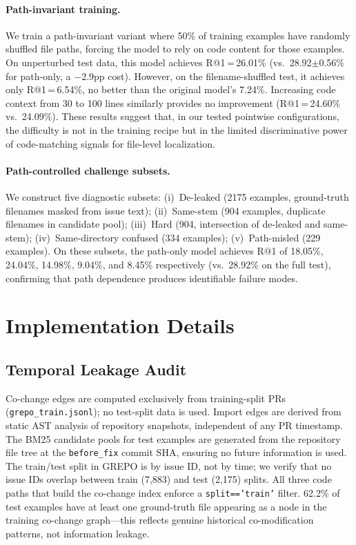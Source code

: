 \documentclass{article}
\begin{document}
\paragraph{Path-invariant training.}
We train a path-invariant variant where 50\% of training examples have randomly shuffled file paths, forcing the model to rely on code content for those examples. On unperturbed test data, this model achieves R@1\,=\,26.01\% (vs.\ 28.92$\pm$0.56\% for path-only, a $-$2.9pp cost). However, on the filename-shuffled test, it achieves only R@1\,=\,6.54\%, no better than the original model's 7.24\%. Increasing code context from 30 to 100 lines similarly provides no improvement (R@1\,=\,24.60\% vs.\ 24.09\%). These results suggest that, in our tested pointwise configurations, the difficulty is not in the training recipe but in the limited discriminative power of code-matching signals for file-level localization.

\paragraph{Path-controlled challenge subsets.}
We construct five diagnostic subsets: (i)~De-leaked (2175 examples, ground-truth filenames masked from issue text); (ii)~Same-stem (904 examples, duplicate filenames in candidate pool); (iii)~Hard (904, intersection of de-leaked and same-stem); (iv)~Same-directory confused (334 examples); (v)~Path-misled (229 examples). On these subsets, the path-only model achieves R@1 of 18.05\%, 24.04\%, 14.98\%, 9.04\%, and 8.45\% respectively (vs.\ 28.92\% on the full test), confirming that path dependence produces identifiable failure modes.


\section{Implementation Details}
\label{app:impl}

\subsection{Temporal Leakage Audit}
\label{app:leakage}

Co-change edges are computed exclusively from training-split PRs (\texttt{grepo\_train.jsonl}); no test-split data is used.
Import edges are derived from static AST analysis of repository snapshots, independent of any PR timestamp.
The BM25 candidate pools for test examples are generated from the repository file tree at the \texttt{before\_fix} commit SHA, ensuring no future information is used.
The train/test split in GREPO is by issue ID, not by time; we verify that no issue IDs overlap between train (7,883) and test (2,175) splits.
All three code paths that build the co-change index enforce a \texttt{split=='train'} filter.
62.2\% of test examples have at least one ground-truth file appearing as a node in the training co-change graph---this reflects genuine historical co-modification patterns, not information leakage.
\end{document}
